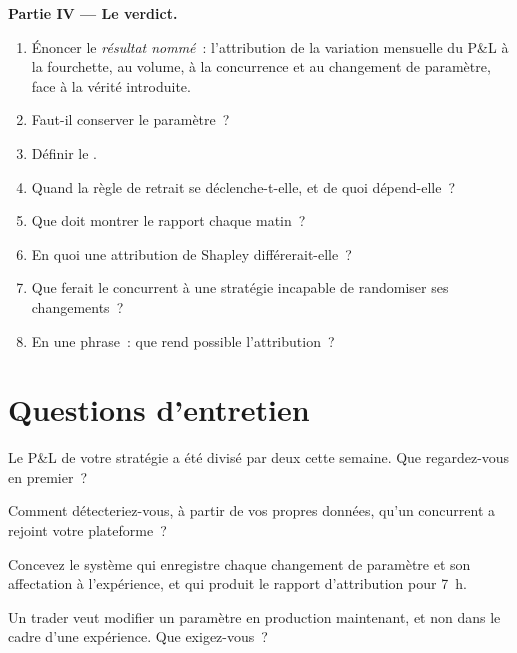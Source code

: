 \begin{problem}
\medskip\noindent\textbf{Partie IV --- Le verdict.}
\begin{enumerate}[resume]
\item Énoncer le \emph{résultat nommé}~: l'attribution de la variation mensuelle du P\&L à la fourchette, au volume, à la concurrence et au changement de paramètre,
face à la vérité introduite.
\item Faut-il conserver le paramètre~?
\item Définir le .
\item Quand la règle de retrait se déclenche-t-elle, et de quoi dépend-elle~?
\item Que doit montrer le rapport chaque matin~?
\item En quoi une attribution de Shapley différerait-elle~?
\item Que ferait le concurrent à une stratégie incapable de randomiser ses changements~?
\item En une phrase~: que rend possible l'attribution~?
\end{enumerate}
\end{problem}

\section{Questions d'entretien}

\begin{interviewq}\label{iq:hf:pnl-analytics-and-the-strategy-lifecycle:1}
Le P\&L de votre stratégie a été divisé par deux cette semaine. Que regardez-vous en premier~?
\end{interviewq}

\begin{interviewq}\label{iq:hf:pnl-analytics-and-the-strategy-lifecycle:2}
Comment détecteriez-vous, à partir de vos propres données, qu'un concurrent a rejoint votre plateforme~?
\end{interviewq}

\begin{interviewq}\label{iq:hf:pnl-analytics-and-the-strategy-lifecycle:3}
Concevez le système qui enregistre chaque changement de paramètre et son affectation à l'expérience, et qui produit le rapport d'attribution pour 7~h.
\end{interviewq}

\begin{interviewq}\label{iq:hf:pnl-analytics-and-the-strategy-lifecycle:4}
Un trader veut modifier un paramètre en production maintenant, et non dans le cadre d'une expérience. Que exigez-vous~?
\end{interviewq}

